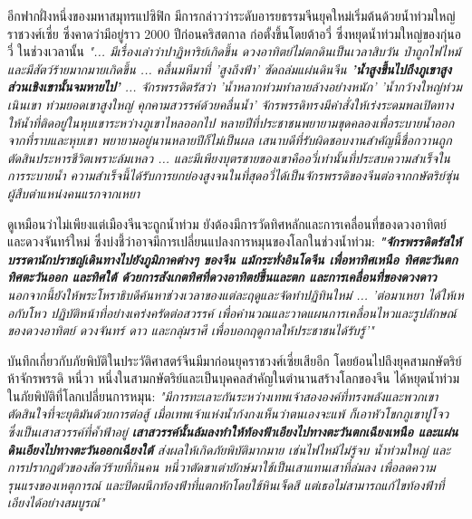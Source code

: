 \documentclass[10pt,twocolumn,letterpaper]{article}
\begin{document}
อีกฟากฝั่งหนึ่งของมหาสมุทรแปซิฟิก มีการกล่าวว่าระดับอารยธรรมจีนยุคใหม่เริ่มต้นด้วยน้ำท่วมใหญ่ ราชวงศ์เซี่ย ซึ่งคาดว่ามีอยู่ราว 2000 ปีก่อนคริสตกาล ก่อตั้งขึ้นโดยต้าอวี่ ซึ่งหยุดน้ำท่วมใหญ่ของกุ่นอวี่ \cite{6} ในช่วงเวลานั้น \textit{"... มีเรื่องเล่าว่าปาฏิหาริย์เกิดขึ้น ดวงอาทิตย์ไม่ตกดินเป็นเวลาสิบวัน ป่าถูกไฟไหม้ และมีสัตว์ร้ายมากมายเกิดขึ้น ... คลื่นมหึมาที่ 'สูงถึงฟ้า' ซัดถล่มแผ่นดินจีน \textbf{'น้ำสูงขึ้นไปถึงภูเขาสูง ส่วนเชิงเขานั้นจมหายไป'} ... จักรพรรดิตรัสว่า 'น้ำหลากท่วมทำลายล้างอย่างหนัก' 'น้ำกว้างใหญ่ท่วมเนินเขา ท่วมยอดเขาสูงใหญ่ คุกคามสวรรค์ด้วยคลื่นน้ำ' จักรพรรดิทรงมีคำสั่งให้เร่งระดมพลเปิดทางให้น้ำที่ติดอยู่ในหุบเขาระหว่างภูเขาไหลออกไป หลายปีที่ประชาชนพยายามขุดคลองเพื่อระบายน้ำออกจากที่ราบและหุบเขา พยายามอยู่นานหลายปีก็ไม่เป็นผล เสนาบดีที่รับผิดชอบงานสำคัญนี้ชื่อกวานถูกตัดสินประหารชีวิตเพราะล้มเหลว ... และมีเพียงบุตรชายของเขาคืออวี่เท่านั้นที่ประสบความสำเร็จในการระบายน้ำ ความสำเร็จนี้ได้รับการยกย่องสูงจนในที่สุดอวี่ได้เป็นจักรพรรดิของจีนต่อจากกษัตริย์ซุ่น ผู้สืบตำแหน่งคนแรกจากเหยา} \cite{5}

ดูเหมือนว่าไม่เพียงแต่เมืองจีนจะถูกน้ำท่วม ยังต้องมีการวัดทิศหลักและการเคลื่อนที่ของดวงอาทิตย์และดวงจันทร์ใหม่ ซึ่งบ่งชี้ว่าอาจมีการเปลี่ยนแปลงการหมุนของโลกในช่วงน้ำท่วม: \textit{\textbf{"จักรพรรดิตรัสให้บรรดานักปราชญ์เดินทางไปยังภูมิภาคต่างๆ ของจีน แม้กระทั่งอินโดจีน เพื่อหาทิศเหนือ ทิศตะวันตก ทิศตะวันออก และทิศใต้ ด้วยการสังเกตทิศที่ดวงอาทิตย์ขึ้นและตก และการเคลื่อนที่ของดวงดาว} นอกจากนี้ยังให้พระโหราธิบดีค้นหาช่วงเวลาของแต่ละฤดูและจัดทำปฏิทินใหม่ ... 'ต่อมาเหยา ได้ให้เหอกับโหว ปฏิบัติหน้าที่อย่างเคร่งครัดต่อสวรรค์ เพื่อคำนวณและวาดแผนการเคลื่อนไหวและรูปลักษณ์ของดวงอาทิตย์ ดวงจันทร์ ดาว และกลุ่มราศี เพื่อบอกฤดูกาลให้ประชาชนได้รับรู้'"} \cite{5}

บันทึกเกี่ยวกับภัยพิบัติในประวัติศาสตร์จีนมีมาก่อนยุคราชวงศ์เซี่ยเสียอีก โดยย้อนไปถึงยุคสามกษัตริย์ห้าจักรพรรดิ \cite{7} หนี่วา หนึ่งในสามกษัตริย์และเป็นบุคคลสำคัญในตำนานสร้างโลกของจีน ได้หยุดน้ำท่วมในภัยพิบัติที่โลกเปลี่ยนการหมุน: \textit{"มีการทะเลาะกันระหว่างเทพเจ้าสององค์ที่ทรงพลังและพวกเขาตัดสินใจที่จะยุติมันด้วยการต่อสู้ เมื่อเทพเจ้าแห่งน้ำก้งกงเห็นว่าตนเองจะแพ้ ก็เอาหัวโขกภูเขาปูโจว ซึ่งเป็นเสาสวรรค์ที่ค้ำฟ้าอยู่ \textbf{เสาสวรรค์นั้นล้มลงทำให้ท้องฟ้าเอียงไปทางตะวันตกเฉียงเหนือ และแผ่นดินเอียงไปทางตะวันออกเฉียงใต้} ส่งผลให้เกิดภัยพิบัติมากมาย เช่นไฟไหม้ไม่รู้จบ น้ำท่วมใหญ่ และการปรากฏตัวของสัตว์ร้ายที่กินคน หนี่วาตัดขาเต่ายักษ์มาใช้เป็นเสาแทนเสาที่ล่มลง เพื่อลดความรุนแรงของเหตุการณ์ และปิดผนึกท้องฟ้าที่แตกหักโดยใช้หินเจ็ดสี แต่เธอไม่สามารถแก้ไขท้องฟ้าที่เอียงได้อย่างสมบูรณ์"} \cite{8}
\end{document}
